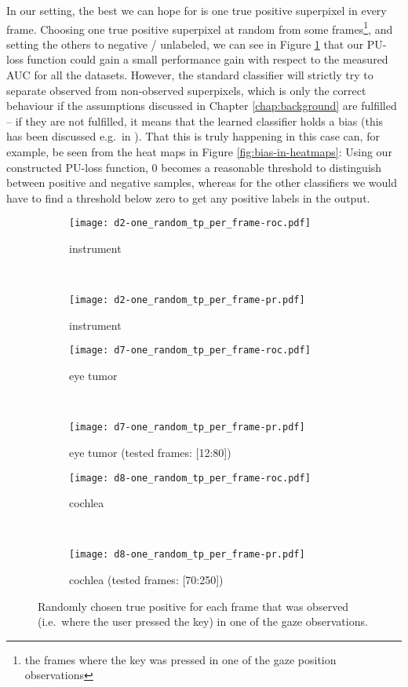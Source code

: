 In our setting, the best we can hope for is one true positive superpixel in every frame. 
Choosing one true positive superpixel at random from some frames\footnote{the frames where the key was pressed in one of the gaze position observations}, and setting the others to negative / unlabeled, we can see in Figure \ref{fig:one-random-tp-per-frame} that our PU-loss function could gain a small performance gain with respect to the measured AUC for all the datasets. 
However, the standard classifier will strictly try to separate observed from non-observed superpixels, which is only the correct behaviour if the assumptions discussed in Chapter \ref{chap:background} are fulfilled -- if they are not fulfilled, it means that the learned classifier holds a bias (this has been discussed e.g.\ in ). 
That this is truly happening in this case can, for example, be seen from the heat maps in Figure \ref{fig:bias-in-heatmaps}: Using our constructed PU-loss function, 0 becomes a reasonable threshold to distinguish between positive and negative samples, whereas for the other classifiers we would have to find a threshold below zero to get any positive labels in the output. 

\begin{figure}[ht]
	\centering
	\begin{subfigure}[h]{0.45\textwidth}
	\texttt{[image: d2-one\_random\_tp\_per\_frame-roc.pdf]}	
		\caption*{instrument}
	\end{subfigure}
	~
	\begin{subfigure}[h]{0.45\textwidth}
	\texttt{[image: d2-one\_random\_tp\_per\_frame-pr.pdf]}	
		\caption*{instrument}
	\end{subfigure}
	
	\vspace{3mm}
	\begin{subfigure}[h]{0.45\textwidth}
	\texttt{[image: d7-one\_random\_tp\_per\_frame-roc.pdf]}	
		\caption*{eye tumor}
	\end{subfigure}
	~
	\begin{subfigure}[h]{0.45\textwidth}
	\texttt{[image: d7-one\_random\_tp\_per\_frame-pr.pdf]}	
		\caption*{eye tumor (tested frames: [12:80])}
	\end{subfigure}	
	
	\vspace{3mm}
	\begin{subfigure}[h]{0.45\textwidth}
	\texttt{[image: d8-one\_random\_tp\_per\_frame-roc.pdf]}	
		\caption*{cochlea}
	\end{subfigure}
	~
	\begin{subfigure}[h]{0.45\textwidth}
	\texttt{[image: d8-one\_random\_tp\_per\_frame-pr.pdf]}	
		\caption*{cochlea (tested frames: [70:250])}
	\end{subfigure}		
	\caption{Randomly chosen true positive for each frame that was observed (i.e.\ where the user pressed the key) in one of the gaze observations.}
	\label{fig:one-random-tp-per-frame}
\end{figure}


